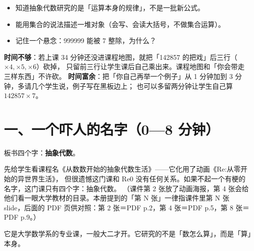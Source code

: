 

\begin{mubiao}
  \begin{itemize}
    \item 知道抽象代数研究的是「运算本身的规律」，不是一批新公式。
    \item 能用集合的说法描述一堆对象（会写、会读大括号，不做集合运算）。
    \item 记住一个悬念：999999 能被 7 整除，为什么？
  \end{itemize}
\end{mubiao}


\begin{beifen}
  \textbf{时间不够}：若上课 34 分钟还没进课程地图，就把「142857 的把戏」后三行（\(\times4,\times5,\times6\)）砍掉，
  只留前三行让学生课后自己乘出来。课程地图和「你会带走三样东西」不许砍。
  \textbf{时间富余}：把「你自己再举一个例子」从 1 分钟加到 3 分钟，多请几个学生说，例子写在黑板边上；
  也可以多留两分钟让学生自己算 \(142857\times7\)。
\end{beifen}

\section*{一、一个吓人的名字（0—8 分钟）}

\noindent 板书四个字：\textbf{抽象代数}。

先给学生看课程名《从数数开始的抽象代数生活》——它化用了动画《Re:从零开始的异世界生活》，
但很遗憾这门课和 Re0 没有任何关系。如果不起一个有梗的名字，这门课只有四个字：抽象代数。
（课件第 2 张放了动画海报，第 4 张会给他们看一眼大学教材的目录。本册提到的「第 N 张」一律指课件里第 N 张 slide，后面的 PDF 页供对照：第 2 张＝PDF p.2，第 4 张＝PDF p.5，第 8 张＝PDF p.9。）

\begin{definition}[抽象代数]
  它是大学数学系的专业课，一般大二才开。它研究的不是「数怎么算」，而是「算」本身。
\end{definition}

